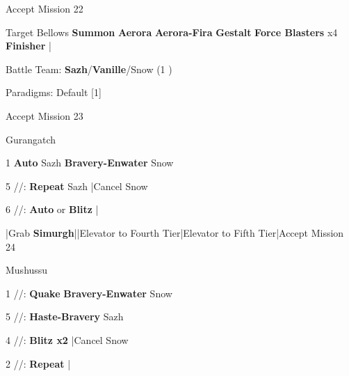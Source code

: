 \begin{mainlist}
	\item Accept Mission 22
	\item {} Target Bellows \to \textbf{Summon} \to \textbf{Aerora} \to \textbf{Aerora-Fira} \to \textbf{Gestalt} \to \textbf{Force Blasters} x4 \to \textbf{Finisher} |\skip
\end{mainlist}
\begin{menu}
	\item Battle Team: \textbf{Sazh}/\textbf{Vanille}/Snow (1 )
	\item Paradigms: Default [1]
\end{menu}
\begin{mainlist}
	\item Accept Mission 23
\end{mainlist}
\begin{fight}{Gurangatch}
	\item [1] \textbf{Auto} Sazh \to \textbf{Bravery-Enwater} Snow
	\item [5] \syn/\sab/\com: \textbf{Repeat} Sazh |Cancel Snow
	\item [6] \com/\rav/\com: \textbf{Auto} or \textbf{Blitz} |\skip
\end{fight}
\begin{mainlist}
	\item \skip|Grab \textbf{Simurgh}|\skip|Elevator to Fourth Tier|Elevator to Fifth Tier|Accept Mission 24
\end{mainlist}
\begin{fight}{Mushussu}
	\item [1] \syn/\sab/\rav: \textbf{Quake} \to \textbf{Bravery-Enwater} Snow
	\item [5] \syn/\sab/\com: \textbf{Haste-Bravery} Sazh
	\item [4] \com/\sab/\com: \textbf{Blitz x2} |Cancel Snow
	\item [2] \com/\med/\com: \textbf{Repeat} |\skip
\end{fight}
